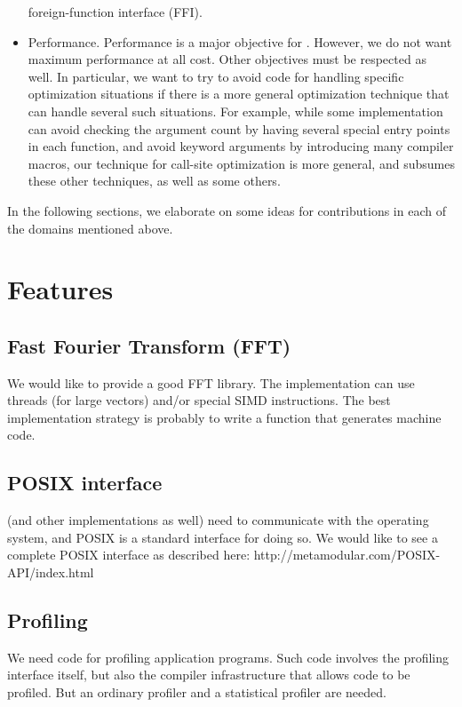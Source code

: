 \begin{itemize}
  foreign-function interface (FFI).
\item Performance.  Performance is a major objective for \sysname{}.
  However, we do not want maximum performance at all cost.  Other
  objectives must be respected as well.  In particular, we want to try
  to avoid code for handling specific optimization situations if there
  is a more general optimization technique that can handle several
  such situations.  For example, while some \commonlisp{}
  implementation can avoid checking the argument count by having
  several special entry points in each function, and avoid keyword
  arguments by introducing many compiler macros, our technique for
  call-site optimization is more general, and subsumes these other
  techniques, as well as some others.
\end{itemize}

In the following sections, we elaborate on some ideas for
contributions in each of the domains mentioned above.

\section{Features}

\subsection{Fast Fourier Transform (FFT)}

We would like to provide a good FFT library.  The implementation can
use threads (for large vectors) and/or special SIMD instructions.  The
best implementation strategy is probably to write a \commonlisp{}
function that generates machine code.

\subsection{POSIX interface}

\sysname{} (and other \commonlisp{} implementations as well) need to
communicate with the operating system, and POSIX is a standard
interface for doing so.  We would like to see a complete POSIX
interface as described here: http://metamodular.com/POSIX-API/index.html

\subsection{Profiling}

We need code for profiling application programs.  Such code involves
the profiling interface itself, but also the compiler infrastructure
that allows code to be profiled.  But an ordinary profiler and a
statistical profiler are needed.

